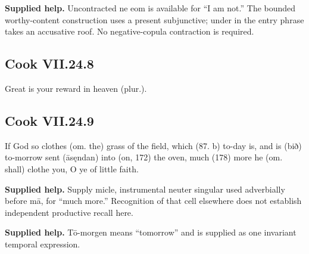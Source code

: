 \textbf{Supplied help.} Uncontracted ne eom is available for “I am not.” The bounded worthy-content construction uses a present subjunctive; under in the entry phrase takes an accusative roof. No negative-copula contraction is required.

\par\begin{minipage}{\linewidth}\raggedright
\subsection*{Cook VII.24.8}

Great is your reward in heaven (plur.).

\end{minipage}\par\addvspace{4pt}

\par\begin{minipage}{\linewidth}\raggedright
\subsection*{Cook VII.24.9}

If God so clothes (om. the) grass of the field, which (87. b) to-day is, and is (bið) to-morrow sent (āsęndan) into (on, 172) the oven, much (178) more he (om. shall) clothe you, O ye of little faith.

\end{minipage}\par\addvspace{4pt}

\textbf{Supplied help.} Supply micle, instrumental neuter singular used adverbially before mā, for “much more.” Recognition of that cell elsewhere does not establish independent productive recall here.

\textbf{Supplied help.} Tō-morgen means “tomorrow” and is supplied as one invariant temporal expression.

